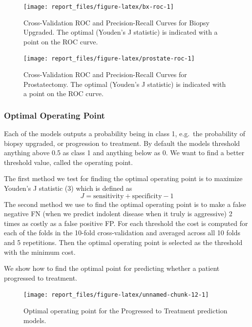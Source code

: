 \documentclass[]{article}
\begin{document}
\begin{figure}

{\centering \texttt{[image: report\_files/figure-latex/bx-roc-1]} 

}

\caption{Cross-Validation ROC and Precision-Recall Curves for Biopsy Upgraded. The optimal (Youden's J statistic) is indicated with a point on the ROC curve.}\label{fig:bx-roc}
\end{figure}

\begin{figure}

{\centering \texttt{[image: report\_files/figure-latex/prostate-roc-1]} 

}

\caption{Cross-Validation ROC and Precision-Recall Curves for Prostatectomy. The optimal (Youden's J statistic) is indicated with a point on the ROC curve.}\label{fig:prostate-roc}
\end{figure}

\hypertarget{optimal-operating-point}{%
\subsubsection{Optimal Operating Point}\label{optimal-operating-point}}

Each of the models outputs a probability being in class 1, e.g.~the probability of biopsy upgraded, or progression to treatment.
By default the models threshold anything above 0.5 as class 1 and anything below as 0.
We want to find a better threshold value, called the operating point.

The first method we test for finding the optimal operating point is to maximize Youden's J statistic (3) which is defined as
\[
J = \text{sensitivity} + \text{specificity} - 1
\]
The second method we use to find the optimal operating point is to make a false negative FN (when we predict indolent disease when it truly is aggressive) 2 times as costly as a false positive FP.
For each threshold the cost is computed for each of the folds in the 10-fold cross-validation and averaged across all 10 folds and 5 repetitions.
Then the optimal operating point is selected as the threshold with the minimum cost.

We show how to find the optimal point for predicting whether a patient progressed to treatment.

\begin{figure}

{\centering \texttt{[image: report\_files/figure-latex/unnamed-chunk-12-1]} 

}

\caption{Optimal operating point for the Progressed to Treatment prediction models.}\label{fig:unnamed-chunk-12}
\end{figure}
\end{document}

